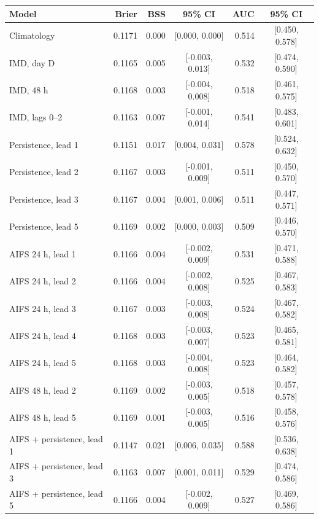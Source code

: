 \begin{tabular}{lrrcrc}\toprule
Model & Brier & BSS & 95\% CI & AUC & 95\% CI \\ \midrule
Climatology & 0.1171 & 0.000 & [0.000, 0.000] & 0.514 & [0.450, 0.578] \\
IMD, day D & 0.1165 & 0.005 & [-0.003, 0.013] & 0.532 & [0.474, 0.590] \\
IMD, 48 h & 0.1168 & 0.003 & [-0.004, 0.008] & 0.518 & [0.461, 0.575] \\
IMD, lags 0--2 & 0.1163 & 0.007 & [-0.001, 0.014] & 0.541 & [0.483, 0.601] \\
\midrule
Persistence, lead 1 & 0.1151 & 0.017 & [0.004, 0.031] & 0.578 & [0.524, 0.632] \\
Persistence, lead 2 & 0.1167 & 0.003 & [-0.001, 0.009] & 0.511 & [0.450, 0.570] \\
Persistence, lead 3 & 0.1167 & 0.004 & [0.001, 0.006] & 0.511 & [0.447, 0.571] \\
Persistence, lead 5 & 0.1169 & 0.002 & [0.000, 0.003] & 0.509 & [0.446, 0.570] \\
\midrule
AIFS 24 h, lead 1 & 0.1166 & 0.004 & [-0.002, 0.009] & 0.531 & [0.471, 0.588] \\
AIFS 24 h, lead 2 & 0.1166 & 0.004 & [-0.002, 0.008] & 0.525 & [0.467, 0.583] \\
AIFS 24 h, lead 3 & 0.1167 & 0.003 & [-0.003, 0.008] & 0.524 & [0.467, 0.582] \\
AIFS 24 h, lead 4 & 0.1168 & 0.003 & [-0.003, 0.007] & 0.523 & [0.465, 0.581] \\
AIFS 24 h, lead 5 & 0.1168 & 0.003 & [-0.004, 0.008] & 0.523 & [0.464, 0.582] \\
\midrule
AIFS 48 h, lead 2 & 0.1169 & 0.002 & [-0.003, 0.005] & 0.518 & [0.457, 0.578] \\
AIFS 48 h, lead 5 & 0.1169 & 0.001 & [-0.003, 0.005] & 0.516 & [0.458, 0.576] \\
\midrule
AIFS + persistence, lead 1 & 0.1147 & 0.021 & [0.006, 0.035] & 0.588 & [0.536, 0.638] \\
AIFS + persistence, lead 3 & 0.1163 & 0.007 & [0.001, 0.011] & 0.529 & [0.474, 0.586] \\
AIFS + persistence, lead 5 & 0.1166 & 0.004 & [-0.002, 0.009] & 0.527 & [0.469, 0.586] \\
\bottomrule\end{tabular}